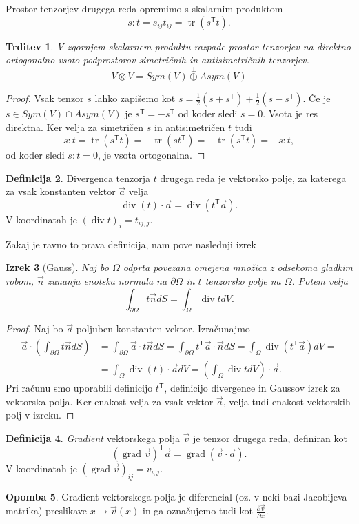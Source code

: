 \documentclass[12pt,a4paper,twoside]{article}
\theoremstyle{definition} %
\newtheorem{definicija}{Definicija}[section]
\newtheorem{opomba}[definicija]{Opomba}
\theoremstyle{plain} %
\newtheorem{izrek}[definicija]{Izrek}
\newtheorem{trditev}[definicija]{Trditev}
\numberwithin{equation}{section}
\newcommand{\T}{\mathsf{T}}
\renewcommand{\div}{\operatorname{div}}
\newcommand{\grad}{\operatorname{grad}}
\newcommand{\dpar}[2]{\ensuremath{\frac{\partial #1}{\partial #2}}}
\newcommand{\vv}{\vec{v}}
\newcommand{\va}{\vec{a}}
\newcommand{\vn}{\vec{n}}
\newcommand{\vx}{x}
\DeclareMathOperator{\tr}{tr}
\begin{document}
Prostor tenzorjev drugega reda opremimo s skalarnim produktom
\[ s:t = s_{ij}t_{ij} = \tr(s^\T t).\]
\begin{trditev}
  \label{trd:dot-antisym-tensor}
  V zgornjem skalarnem produktu razpade prostor tenzorjev na direktno
  ortogonalno vsoto podprostorov simetričnih in antisimetričnih tenzorjev.
  \[V\otimes V = Sym(V) \overset{\perp}{\oplus} Asym(V) \]
\end{trditev}
\begin{proof}
  Vsak tenzor $s$ lahko zapišemo kot $s = \frac12 (s+s^\T) + \frac12(s-s^\T)$.
  Če je $s \in Sym(V)\cap Asym(V)$ je $s^\T = -s^\T$ od koder sledi $s = 0$.
  Vsota je res direktna. Ker velja za simetričen $s$ in antisimetričen $t$ tudi
  \[ s:t = \tr(s^\T t) =  -\tr(s t^\T) = -\tr(s^\T t) = -s:t,\]
  od koder sledi $s:t = 0$, je vsota ortogonalna.
\end{proof}

\begin{definicija}
  Divergenca tenzorja $t$ drugega reda je vektorsko polje, za katerega za vsak
  konstanten vektor $\va$ velja
  \[ \div(t)\cdot \va = \div(t^\T \va). \]
  V koordinatah je $(\div t)_i = t_{ij,j}$.
\end{definicija}

Zakaj je ravno to prava definicija, nam pove naslednji izrek
\begin{izrek}[Gauss]
  \label{izr:gauss}
  Naj bo $\Omega$ odprta povezana omejena množica z odsekoma gladkim robom, $\vn$ zunanja enotska
  normala na $\partial \Omega$ in $t$ tenzorsko polje na $\Omega$.  Potem velja
  \[
    \int_{\partial \Omega} t\vn dS = \int_{\Omega} \div t dV.
  \]
\end{izrek}
\begin{proof}
Naj bo $\va$ poljuben konstanten vektor. Izračunajmo
\begin{align*}
  \va \cdot \left( \int_{\partial \Omega} t\vn dS \right) &=
  \int_{\partial \Omega}\va \cdot t\vn dS =
  \int_{\partial \Omega}t^\T \va \cdot \vn dS =
  \int_{\Omega}\div(t^\T \va) dV = \\ &=
  \int_{\Omega}\div(t) \cdot \va dV =
  \left(\int_{\Omega}\div t dV\right) \cdot \va.
\end{align*}
Pri računu smo uporabili definicijo $t^\T$, definicijo divergence in Gaussov
izrek za vektorska polja. Ker enakost velja za vsak vektor $\va$, velja tudi
enakost vektorskih polj v izreku.
\end{proof}

\begin{definicija}
  \emph{Gradient} vektorskega polja $\vv$ je tenzor drugega reda, definiran kot
  \[
    (\grad\vv)^\T \va = \grad(\vv\cdot\va).
  \]
  V koordinatah je $(\grad\vv)_{ij} = v_{i,j}$.
\end{definicija}
\begin{opomba}
  Gradient vektorskega polja je diferencial (oz. v neki bazi Jacobijeva matrika)
  preslikave $\vx \mapsto \vv(\vx)$ in ga označujemo tudi kot $\dpar{\vv}{\vx}$.
\end{opomba}
\end{document}
